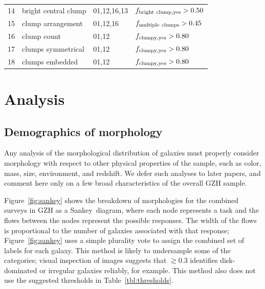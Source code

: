 \documentclass[twocolumn]{aastex6}
\begin{document}
\begin{table}
\begin{tabular}{llll}
14       & bright central clump & 01,12,16,13      & $f_{\rm bright~clump,yes}>0.50$    \\
15       & clump arrangement    & 01,12,16         & $f_{\rm multiple~clumps}>0.45$     \\
16       & clump count          & 01,12            & $f_{\rm clumpy,yes}>0.80$          \\
17       & clumps symmetrical   & 01,12            & $f_{\rm clumpy,yes}>0.80$          \\
18       & clumps embedded      & 01,12            & $f_{\rm clumpy,yes}>0.80$          \\
\hline\hline
\end{tabular}
\end{table}

\section{Analysis}\label{sec:analysis}


\subsection{Demographics of morphology}

Any analysis of the morphological distribution of galaxies must properly consider morphology with respect to other physical properties of the sample, such as color, mass, size, environment, and redshift. We defer such analyses to later papers, and comment here only on a few broad characteristics of the overall GZH sample. 

Figure~\ref{fig:sankey} shows the breakdown of morphologies for the combined surveys in GZH as a Sankey~diagram, where each node represents a task and the flows between the nodes represent the possible responses. The width of the flows is proportional to the number of galaxies associated with that response; Figure~\ref{fig:sankey} uses a simple plurality vote to assign the combined set of labels for each galaxy. This method is likely to undersample some of the categories; visual inspection of images suggests that \ffeatures$\gtrsim0.3$ identifies disk-dominated or irregular galaxies reliably, for example. This method also does not use the suggested thresholds in Table~\ref{tbl:thresholds}. 
\end{document}
